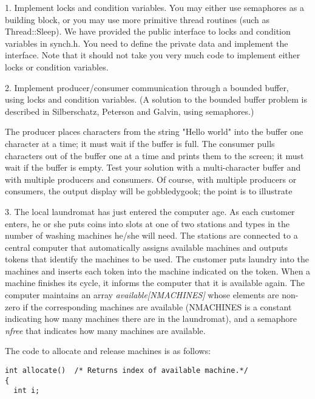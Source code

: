 \begin{description}

\item{1.}
Implement locks and condition variables.  You may either use semaphores 
as a building block, or you may use more primitive thread routines (such
as Thread::Sleep).  We have provided the public interface to locks 
and condition variables in synch.h.  You need to define the private 
data and implement the interface.  Note that it should not take you very 
much code to implement either locks or condition variables.

\item{2.}
Implement producer/consumer communication through a bounded buffer,  
using locks and condition variables.  (A solution to the bounded buffer 
problem is described in Silberschatz, Peterson and Galvin, using 
semaphores.)

The producer places characters from the string "Hello world" into the 
buffer one character at a time; it must wait if the buffer is full.
The consumer pulls characters out of the buffer one at a time
and prints them to the screen; it must wait if the buffer is empty.
Test your solution with a multi-character buffer and with multiple 
producers and consumers.  Of course, with multiple producers or consumers,
the output display will be gobbledygook; the point is to illustrate

\item{3.} The local laundromat has just entered the computer age.
As each customer enters, he or she puts coins into
slots at one of two stations and types in
the number of washing machines he/she will need.  The stations
are connected to a central computer that
automatically assigns available machines and outputs
tokens that identify the machines to be used.  The
customer puts laundry into the machines and inserts each
token into the machine indicated on the token.  When a machine finishes
its cycle, it informs the computer that it is available again.
The computer maintains an array {\em available[NMACHINES]} whose elements are
non-zero if the corresponding machines are available (NMACHINES is
a constant indicating how many machines there are in the
laundromat), and a semaphore {\em nfree} that indicates how many 
machines are available.

The code to allocate and release machines is as follows:

\begin{verbatim}
int allocate()	/* Returns index of available machine.*/
{
  int i;


\end{verbatim}
\end{description}

